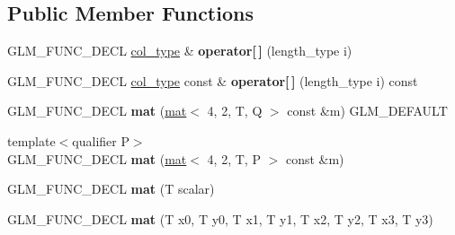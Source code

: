 \subsection*{Public Member Functions}
\begin{DoxyCompactItemize}
\item 
\mbox{\label{structglm_1_1mat_3_014_00_012_00_01T_00_01Q_01_4_ac3817abff98f5328dd58c18536a6a368}} 
G\+L\+M\+\_\+\+F\+U\+N\+C\+\_\+\+D\+E\+CL \hyperlink{structglm_1_1vec_3_012_00_01T_00_01Q_01_4}{col\+\_\+type} \& {\bfseries operator\mbox{[}$\,$\mbox{]}} (length\+\_\+type i)
\item 
\mbox{\label{structglm_1_1mat_3_014_00_012_00_01T_00_01Q_01_4_a93bfd9601db1127f3204daa428f627e6}} 
G\+L\+M\+\_\+\+F\+U\+N\+C\+\_\+\+D\+E\+CL \hyperlink{structglm_1_1vec_3_012_00_01T_00_01Q_01_4}{col\+\_\+type} const  \& {\bfseries operator\mbox{[}$\,$\mbox{]}} (length\+\_\+type i) const
\item 
\mbox{\label{structglm_1_1mat_3_014_00_012_00_01T_00_01Q_01_4_a7b7b0a367ac55c5bdd854c8236169e64}} 
G\+L\+M\+\_\+\+F\+U\+N\+C\+\_\+\+D\+E\+CL {\bfseries mat} (\hyperlink{structglm_1_1mat}{mat}$<$ 4, 2, T, Q $>$ const \&m) G\+L\+M\+\_\+\+D\+E\+F\+A\+U\+LT
\item 
\mbox{\label{structglm_1_1mat_3_014_00_012_00_01T_00_01Q_01_4_a3f0fb63f0859e6163336621a86f082df}} 
{\footnotesize template$<$qualifier P$>$ }\\G\+L\+M\+\_\+\+F\+U\+N\+C\+\_\+\+D\+E\+CL {\bfseries mat} (\hyperlink{structglm_1_1mat}{mat}$<$ 4, 2, T, P $>$ const \&m)
\item 
\mbox{\label{structglm_1_1mat_3_014_00_012_00_01T_00_01Q_01_4_ab426ab46bb1ef3de49820815efa19ef3}} 
G\+L\+M\+\_\+\+F\+U\+N\+C\+\_\+\+D\+E\+CL {\bfseries mat} (T scalar)
\item 
\mbox{\label{structglm_1_1mat_3_014_00_012_00_01T_00_01Q_01_4_a2a5662a8d545812509294975a32bb2d4}} 
G\+L\+M\+\_\+\+F\+U\+N\+C\+\_\+\+D\+E\+CL {\bfseries mat} (T x0, T y0, T x1, T y1, T x2, T y2, T x3, T y3)

\end{DoxyCompactItemize}
